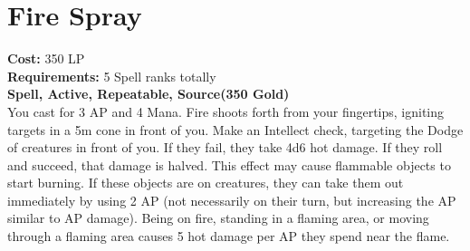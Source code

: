 \section{Fire Spray}\label{spell:fireSpray}
\textbf{Cost:} 350 LP\\
\textbf{Requirements:} 5 Spell ranks totally\\
\textbf{Spell, Active, Repeatable, Source(350 Gold)}\\
You cast for 3 AP and 4 Mana.
Fire shoots forth from your fingertips, igniting targets in a 5m cone in front of you.
Make an Intellect check, targeting the Dodge of creatures in front of you.
If they fail, they take 4d6 hot damage.
If they roll and succeed, that damage is halved.
This effect may cause flammable objects to start burning.
If these objects are on creatures, they can take them out immediately by using 2 AP (not necessarily on their turn, but increasing the AP similar to AP damage).
Being on fire, standing in a flaming area, or moving through a flaming area causes 5 hot damage per AP they spend near the flame.